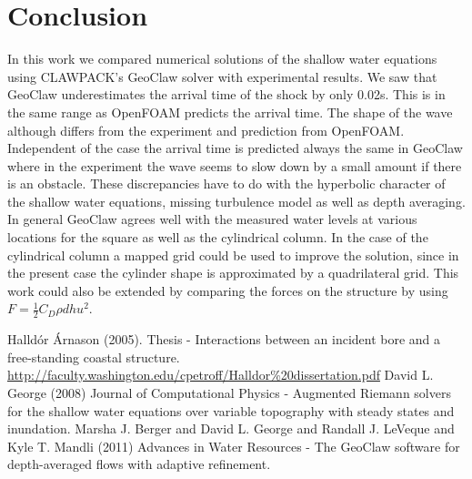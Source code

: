 \documentclass[11pt]{article}
\begin{document}
\section{Conclusion}\label{Sec:Conclusion}
In this work we compared numerical solutions of the shallow water equations using CLAWPACK's GeoClaw solver with experimental results. We saw that GeoClaw underestimates the arrival time of the shock by only 0.02s. This is in the same range as OpenFOAM predicts the arrival time. The shape of the wave although differs from the experiment and prediction from OpenFOAM. Independent of the case the arrival time is predicted always the same in GeoClaw where in the experiment the wave seems to slow down by a small amount if there is an obstacle. These discrepancies have to do with the hyperbolic character of the shallow water equations, missing turbulence model as well as depth averaging. In general GeoClaw agrees well with the measured water levels at various locations for the square as well as the cylindrical column. In the case of the cylindrical column a mapped grid could be used to improve the solution, since in the present case the cylinder shape is approximated by a quadrilateral grid. This work could also be extended by comparing the forces on the structure by using $F =\frac{1}{2}C_D\rho d hu^2$.
 
{\footnotesize
\begin{thebibliography}{100}
 Halld\'or \'Arnason  (2005). Thesis - Interactions between an incident bore and a free-standing coastal structure. \url{http://faculty.washington.edu/cpetroff/Halldor%20dissertation.pdf}
 David L. George (2008) Journal of Computational Physics - Augmented Riemann solvers for the shallow water equations over variable topography with steady states and inundation.
 Marsha J. Berger and David L. George and Randall J. LeVeque and Kyle T. Mandli (2011) Advances in Water Resources - The GeoClaw software for depth-averaged flows with adaptive refinement.
\end{thebibliography}
}
\end{document}
